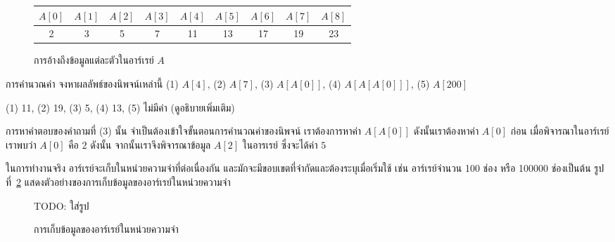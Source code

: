 \begin{figure}
\begin{center}
\begin{tabular}{|c|c|c|c|c|c|c|c|c|}
\hline
$A[0]$ & $A[1]$ & $A[2]$ & $A[3]$ & $A[4]$ & $A[5]$ & $A[6]$ & $A[7]$ & $A[8]$ \\
\hline
2 & 3 & 5 & 7 & 11 & 13 & 17 & 19 & 23\\
\hline
\end{tabular}
\end{center}
\caption{การ{\wbr}อ้าง{\wbr}ถึง{\wbr}ข้อมูล{\wbr}แต่ละ{\wbr}ตัว{\wbr}ใน{\wbr}อาร์{\wbr}เรย์ $A$}
\label{fig:array-array-access}
\end{figure}


\begin{quiz}{การ{\wbr}คำนวณ{\wbr}ค่า}
จง{\wbr}หา{\wbr}ผลลัพธ์{\wbr}ของ{\wbr}นิพจน์{\wbr}เหล่า{\wbr}นี้ (1) $A[4]$, (2) $A[7]$, (3) $A[A[0]]$, 
(4) $A[A[A[0]]]$, (5) $A[200]$
\end{quiz}
\begin{quizans}
(1) 11, (2) 19, (3) 5, (4) 13, (5) ไม่{\wbr}มี{\wbr}ค่า (ดู{\wbr}อธิบาย{\wbr}เพิ่มเติม)
\end{quizans}

การ{\wbr}หา{\wbr}คำ{\wbr}ตอบ{\wbr}ของ{\wbr}คำ{\wbr}ถาม{\wbr}ที่ (3) นั้น จำเป็น{\wbr}ต้อง{\wbr}เข้าใจ{\wbr}ขั้นตอน{\wbr}การ{\wbr}คำนวณ{\wbr}ค่า{\wbr}ของ{\wbr}นิพจน์{\wbr}
เรา{\wbr}ต้องการ{\wbr}หา{\wbr}ค่า $A[A[0]]$ ดังนั้น{\wbr}เรา{\wbr}ต้องหา{\wbr}ค่า $A[0]$ ก่อน{\wbr}
เมื่อ{\wbr}พิจารณา{\wbr}ใน{\wbr}อาร์{\wbr}เรย์{\wbr}เรา{\wbr}พบ{\wbr}ว่า $A[0]$ คือ $2$ ดังนั้น จาก{\wbr}นั้น{\wbr}เรา{\wbr}จึง{\wbr}พิจารณา{\wbr}ข้อมูล{\wbr}
$A[2]$ ใน{\wbr}อา{\wbr}รเรย์ ซึ่ง{\wbr}จะ{\wbr}ได้{\wbr}ค่า $5$

ใน{\wbr}การ{\wbr}ทำงาน{\wbr}จริง อาร์{\wbr}เรย์{\wbr}จะ{\wbr}เก็บ{\wbr}ใน{\wbr}หน่วย{\wbr}ความ{\wbr}จำ{\wbr}ที่{\wbr}ต่อ{\wbr}เนื่อง{\wbr}กัน{\wbr}
และ{\wbr}มัก{\wbr}จะ{\wbr}มี{\wbr}ขอบเขต{\wbr}ที่{\wbr}จำกัด{\wbr}และ{\wbr}ต้อง{\wbr}ระบุ{\wbr}เมื่อ{\wbr}เริ่ม{\wbr}ใช้ เช่น อาร์{\wbr}เรย์{\wbr}จำนวน 100 ช่อง หรือ{\wbr}
100000 ช่อง{\wbr}เป็นต้น รูป{\wbr}ที่~\ref{fig:array-array-in-mem}
แสดง{\wbr}ตัวอย่าง{\wbr}ของ{\wbr}การ{\wbr}เก็บ{\wbr}ข้อมูล{\wbr}ของ{\wbr}อาร์{\wbr}เรย์{\wbr}ใน{\wbr}หน่วย{\wbr}ความ{\wbr}จำ{\wbr}

\begin{figure}
TODO: ใส่{\wbr}รูป{\wbr}
\caption{การ{\wbr}เก็บ{\wbr}ข้อมูล{\wbr}ของ{\wbr}อาร์{\wbr}เรย์{\wbr}ใน{\wbr}หน่วย{\wbr}ความ{\wbr}จำ}
\label{fig:array-array-in-mem}
\end{figure}

